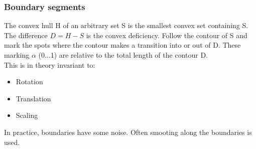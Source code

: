 \subsubsection{Boundary segments}
The convex hull H of an arbitrary set S is the smallest convex set containing S. The difference $D=H-S$ is the convex deficiency. Follow the contour of S and mark the spots where the contour makes a transition into or out of D. These marking $\alpha$ (0...1) are relative to the total length of the contour D.\\
This is in theory invariant to:\\
\begin{itemize}
\item Rotation
\item Translation
\item Scaling
\end{itemize}
In practice, boundaries have some noise. Often smooting along the boundaries is used.\\
